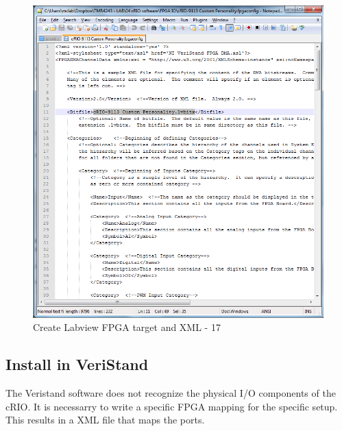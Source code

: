 \begin{figure}[htb!]
	\centering \includegraphics[scale=0.45]{Screenshots/Screenshot_2015-01-17_13-59-31.png}
	\caption{Create Labview FPGA target and XML - 17}
	\label{fig: Create Labview FPGA target and XML-17} 
\end{figure}

\subsection{Install in VeriStand}\label{sec:install_FPGA_in_veristand}

The Veristand software does not recognize the physical I/O components of the cRIO. It is necessarry to write a specific FPGA mapping for the specific setup. This results in a XML file that maps the ports. 

